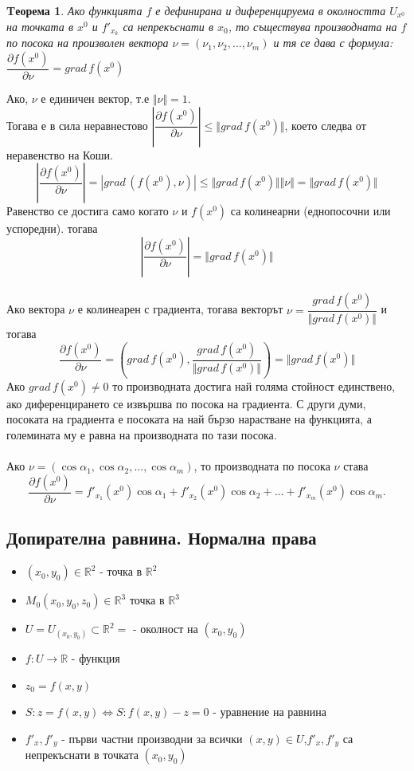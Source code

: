 \documentclass[a4paper,fleqn,12pt]{article}
\newtheorem{theorem}{Tеорема}[subsection]
\theoremstyle{definition}
\begin{document}
\begin {theorem}
Ако функцията $f$ е дефинирана и диференцируема в околността $U_{x^0}$ на точката в $x^0$ и $f'_{x_k}$ са непрекъснати в $x_0$, то съществува производната на $f$ по посока на  произволен вектора $\nu = (\nu_1, \nu_2, ..., \nu_m)$ и тя се дава с формула: $\dfrac{\partial f(x^0)}{\partial \nu} = grad \, f(x^0)$
\end {theorem}
Ако, $\nu$ е единичен вектор, т.е $\Vert \nu \Vert = 1$. \\
Тогава е в сила неравнестово $\left \vert  \dfrac{\partial f(x^0)}{\partial \nu}\right\vert  \leq \Vert grad \, f(x^0)  \Vert$, което следва от неравенство на Коши. 
$$\left \vert  \dfrac{\partial f(x^0)}{\partial \nu}\right\vert  = \left\vert  grad \, (f(x^0), \nu) \right\vert  \leq \Vert grad \, f(x^0) \Vert \Vert \nu \Vert = \Vert grad \, f(x^0)  \Vert$$
Равенство се достига само когато $\nu$ и $f(x^0)$ са колинеарни (еднопосочни или успоредни). тогава
$$\left \vert  \dfrac{\partial f(x^0)}{\partial \nu}\right\vert  = \Vert grad \, f(x^0)  \Vert$$
\\
Ако вектора $\nu$ е колинеарен с градиента, тогава векторът $\nu =  \dfrac{grad \, f(x^0)}{\Vert grad \, f(x^0) \Vert}$ и тогава 
$$
\dfrac{\partial f(x^0)}{\partial \nu} = \left( grad \, f(x^0),  \dfrac{grad \, f(x^0)}{\Vert grad \, f(x^0) \Vert} \right) = \Vert grad \, f(x^0) \Vert
$$
Ако $grad \, f(x^0) \neq 0$ то производната достига най голяма стойност единствено, ако диференцирането се извършва по посока на градиента. С други думи, посоката на градиента е посоката на най бързо нарастване на функцията, а големината му е равна на производната по тази посока. \\
\\
Ако $\nu = (\cos \alpha_1, \cos \alpha_2, ..., \cos \alpha_m)$, то производната по посока $\nu$ става 
$$\dfrac{\partial f(x^0)}{\partial \nu} = f'_{x_1}(x^0)\cos{\alpha_1} + f'_{x_2}(x^0)\cos{\alpha_2} + ... + f'_{x_m}(x^0)\cos{\alpha_m}.$$

\subsection{Допирателна равнина. Нормална права}

\begin{itemize}
\item $(x_0, y_0) \in \mathbb{R}^2$ - точка в $\mathbb{R}^2$
\item $M_0 (x_0, y_0, z_0) \in \mathbb{R}^3$  точка в $\mathbb{R}^3$
\item $U = U_{(x_0,y_0)} \subset \mathbb{R}^2 =$ - околност на $(x_0,y_0)$ 
\item $f: U \to \mathbb{R}$ - функция 
\item $z_0 = f(x,y)$ 
\item $S: z = f(x,y) \iff  S: f(x,y) - z = 0$ - уравнение на равнина 
\item $f'_x, f'_y$ - първи частни производни за всички $(x, y) \in U$,$ f'_x, f'_y$ са непрекъснати в точката $(x_0, y_0)$
\end{itemize}
\end{document}
